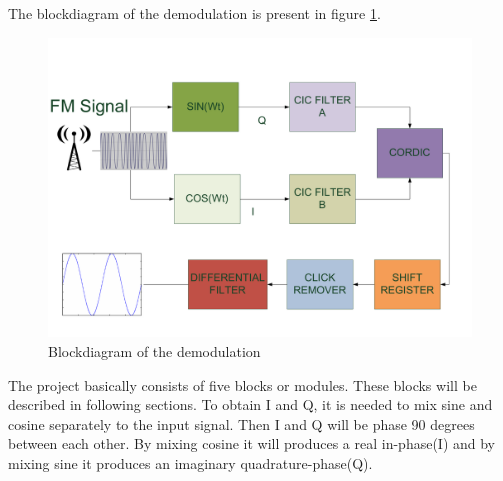 The blockdiagram of the demodulation is present in figure \ref{fig:blockdiagram}. 
\begin{figure}[h]
 \centering
 \includegraphics[scale=0.5]{images/blockdiagram.pdf}
 \caption{Blockdiagram of the demodulation}
 \label{fig:blockdiagram}
\end{figure}

The project basically consists of five blocks or modules. These blocks will be described in following sections. To obtain I and Q, it is needed to mix sine and cosine separately to the input signal. Then I and Q will be phase 90 degrees between each other. By mixing cosine it will produces a real in-phase(I) and by mixing sine it produces an imaginary quadrature-phase(Q).